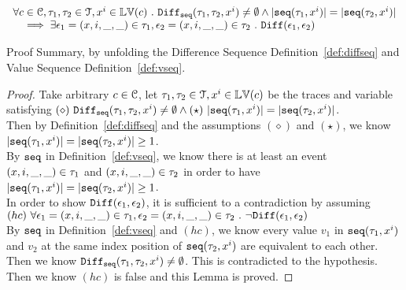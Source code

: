 %
\begin{lem}
	\label{lem:diffval_inv}
\[
	\begin{array}{l}
	\forall c \in \mathcal{C}, \mathtt{\tau}_1, \mathtt{\tau}_2 \in \mathcal{T}, x^i \in \mathbb{LV}(c) ~.~ 
	\mathtt{Diff}_{\mathtt{seq}}(\mathtt{\tau}_1, \mathtt{\tau}_2, x^i) \neq \emptyset \land |\mathtt{seq}(\mathtt{\tau}_1, x^i)| = |\mathtt{seq}(\mathtt{\tau}_2, x^i)|
	\\ \quad \implies
	\exists \mathtt{\epsilon}_1 = (x, i, \_, \_) \in \mathtt{\tau}_1, \mathtt{\epsilon}_2 = (x, i, \_, \_) \in \mathtt{\tau}_2 ~.~ \mathtt{Diff}(\mathtt{\epsilon}_1, \mathtt{\epsilon}_2)
\end{array}
\]
\end{lem}
Proof Summary, by unfolding the Difference Sequence Definition~\ref{def:diffseq} and Value Sequence Definition~\ref{def:vseq}.
\begin{proof}
	Take arbitrary $c \in \mathcal{C}$,
%
let $\mathtt{\tau}_1, \mathtt{\tau}_2 \in \mathcal{T}, x^i\in \mathbb{LV}(c)$ 
be the traces and variable satisfying 
$(\diamond) ~ \sdiff(\trace_1, \trace_2, x^i) \neq \emptyset 
\land 
(\star)~|\seq(\trace_1, x^i)| = |\seq(\trace_2, x^i)|$.
\\
Then by Definition~\ref{def:diffseq} and the assumptions $(\diamond)$ and $(\star)$,
we know $|\mathtt{seq}(\mathtt{\tau}_1, x^i)| = |\mathtt{seq}(\mathtt{\tau}_2, x^i)| \geq 1$.
\\
By $\mathtt{seq}$ in Definition~\ref{def:vseq}, we know there is at least an event $(x, i, \_, \_) \in \mathtt{\tau}_1$ and 
$(x, i, \_, \_) \in \mathtt{\tau}_2$
in order to have $|\mathtt{seq}(\mathtt{\tau}_1, x^i)| = |\mathtt{seq}(\mathtt{\tau}_2, x^i)| \geq 1$.
\\
In order to show $\mathtt{Diff}(\mathtt{\epsilon}_1, \mathtt{\epsilon}_2)$, it is sufficient to a contradiction 
by assuming 
\\
$(hc)~ \forall \mathtt{\epsilon}_1 = (x, i, \_, \_) \in \mathtt{\tau}_1, \mathtt{\epsilon}_2 = (x, i, \_, \_) \in \mathtt{\tau}_2 ~.~ \neg \mathtt{Diff}(\mathtt{\epsilon}_1, \mathtt{\epsilon}_2)$
\\
By $\mathtt{seq}$ in Definition~\ref{def:vseq} and $(hc)$, we know every value $v_1$ in $\mathtt{seq}(\mathtt{\tau}_1, x^i)$ and $v_2$ at the same
index position of $\mathtt{seq}(\mathtt{\tau}_2, x^i)$
are equivalent to each other.
\\
Then we know $\mathtt{Diff}_{\mathtt{seq}}(\mathtt{\tau}_1, \mathtt{\tau}_2, x^i) \neq \emptyset$. This is contradicted to the hypothesis.
\\
Then we know $(hc)$ is false and this Lemma is proved.
%
\end{proof}

